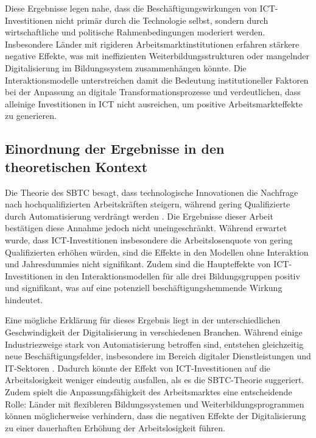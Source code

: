 Diese Ergebnisse legen nahe, dass die Beschäftigungswirkungen von \ac{ICT}-Investitionen 
nicht primär durch die Technologie selbst, sondern durch wirtschaftliche und politische 
Rahmenbedingungen moderiert werden. Insbesondere Länder mit rigideren 
Arbeitsmarktinstitutionen erfahren stärkere negative Effekte, was mit ineffizienten 
Weiterbildungsstrukturen oder mangelnder Digitalisierung im Bildungssystem zusammenhängen 
könnte. Die Interaktionsmodelle unterstreichen damit die Bedeutung institutioneller 
Faktoren bei der Anpassung an digitale Transformationsprozesse und verdeutlichen, dass 
alleinige Investitionen in \ac{ICT} nicht ausreichen, um positive Arbeitsmarkteffekte 
zu generieren.

\subsection{Einordnung der Ergebnisse in den theoretischen Kontext}

Die Theorie des \ac{SBTC} besagt, dass technologische Innovationen die Nachfrage nach 
hochqualifizierten Arbeitskräften steigern, während gering Qualifizierte durch 
Automatisierung verdrängt werden \parencite[S. 7]{acemoglu2002technical}. Die Ergebnisse 
dieser Arbeit bestätigen diese Annahme jedoch nicht uneingeschränkt. Während erwartet 
wurde, dass \ac{ICT}-Investitionen insbesondere die Arbeitslosenquote von gering 
Qualifizierten erhöhen würden, sind die Effekte in den Modellen ohne Interaktion und 
Jahresdummies nicht signifikant. Zudem sind die Haupteffekte von \ac{ICT}-Investitionen 
in den Interaktionsmodellen für alle drei Bildungsgruppen positiv und signifikant, 
was auf eine potenziell beschäftigungshemmende Wirkung hindeutet.

Eine mögliche Erklärung für dieses Ergebnis liegt in der unterschiedlichen Geschwindigkeit 
der Digitalisierung in verschiedenen Branchen. Während einige Industriezweige stark 
von Automatisierung betroffen sind, entstehen gleichzeitig neue Beschäftigungsfelder, 
insbesondere im Bereich digitaler Dienstleistungen und IT-Sektoren 
\parencite[S. 1554f]{autor2013thegrowth}. Dadurch könnte der Effekt von 
\ac{ICT}-Investitionen auf die Arbeitslosigkeit weniger eindeutig ausfallen, als es die 
\ac{SBTC}-Theorie suggeriert. Zudem spielt die Anpassungsfähigkeit des Arbeitsmarktes 
eine entscheidende Rolle: Länder mit flexibleren Bildungssystemen und 
Weiterbildungsprogrammen können möglicherweise verhindern, dass die negativen Effekte 
der Digitalisierung zu einer dauerhaften Erhöhung der Arbeitslosigkeit führen.

